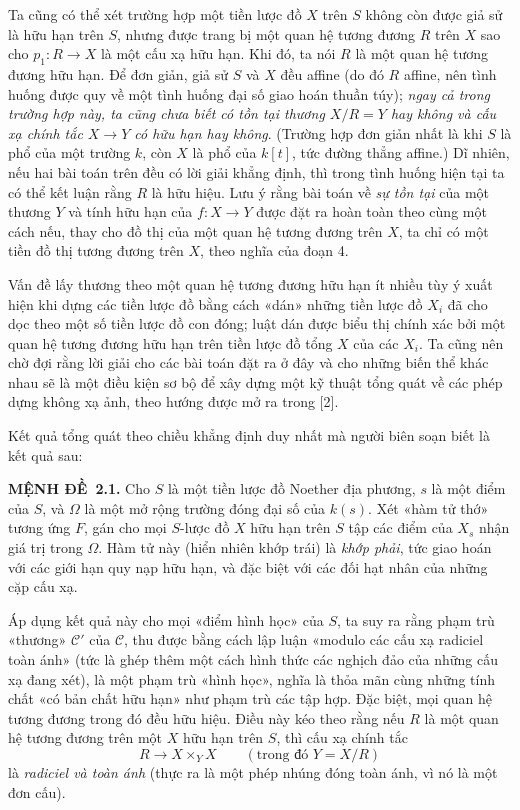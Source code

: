 \documentclass[11pt,twoside,openany]{book}
\numberwithin{equation}{section}
\newcommand{\src}[1]{%
  \phantomsection\hypertarget{src:\fgasourceid:#1}{}%
  \marginpar{\raggedleft\footnotesize\sffamily #1}%
}
\newcommand{\fgasourceid}{unset}
\newcommand{\result}[2]{\par\medskip\noindent\textbf{#1\if\relax\detokenize{#2}\relax\else\ #2\fi.}\quad}
\begin{document}
Ta cũng có thể xét trường hợp một tiền lược đồ $X$ trên $S$ không còn được
giả sử là hữu hạn trên $S$, nhưng được trang bị một quan hệ tương đương $R$
trên $X$ sao cho $p_1:R\longrightarrow X$ là một cấu xạ hữu hạn. Khi đó, ta
nói $R$ là một quan hệ tương đương hữu hạn. Để đơn giản, giả sử $S$ và $X$
đều affine (do đó $R$ affine, nên tình huống được quy về một tình huống đại số
giao hoán thuần túy); \emph{ngay cả trong trường hợp này, ta cũng chưa biết có
tồn tại thương $X/R=Y$ hay không và cấu xạ chính tắc
$X\longrightarrow Y$ có hữu hạn hay không}. (Trường hợp đơn giản nhất là khi
$S$ là phổ của một trường $k$, còn $X$ là phổ của $k[t]$, tức đường thẳng
affine.) Dĩ nhiên, nếu hai bài toán trên đều có lời giải khẳng định, thì trong
tình huống hiện tại ta có thể kết luận rằng $R$ là hữu hiệu. Lưu ý rằng bài
toán về \emph{sự tồn tại} của một thương $Y$ và tính hữu hạn của
$f:X\longrightarrow Y$ được đặt ra hoàn toàn theo cùng một cách nếu, thay cho
đồ thị của một quan hệ tương đương trên $X$, ta chỉ có một tiền đồ thị tương
đương trên $X$, theo nghĩa của đoạn 4.

Vấn đề lấy thương theo một quan hệ tương đương hữu hạn ít nhiều tùy ý xuất
hiện khi dựng các tiền lược đồ bằng cách «dán» những tiền lược đồ $X_i$ đã cho
dọc theo một số tiền lược đồ con đóng; luật dán được biểu thị chính xác bởi
một quan hệ tương đương hữu hạn trên tiền lược đồ tổng $X$ của các $X_i$. Ta
cũng nên chờ đợi rằng lời giải cho các bài toán đặt ra ở đây và cho những biến
thể khác nhau sẽ là một điều kiện sơ bộ để xây dựng một kỹ thuật tổng quát về
các phép dựng không xạ ảnh, theo hướng được mở ra trong [2].

Kết quả tổng quát theo chiều khẳng định duy nhất mà người biên soạn biết là
kết quả sau:

\result{MỆNH ĐỀ}{2.1} Cho $S$ là một tiền lược đồ Noether địa phương, $s$ là
một điểm của $S$, và $\Omega$ là một mở rộng trường đóng đại số của $k(s)$.
Xét
\src{104}«hàm tử thớ» tương ứng $F$, gán cho mọi $S$-lược đồ $X$ hữu hạn
trên $S$ tập các điểm của $X_s$ nhận giá trị trong $\Omega$. Hàm tử này (hiển
nhiên khớp trái) là \emph{khớp phải}, tức giao hoán với các giới hạn quy nạp
hữu hạn, và đặc biệt với các đối hạt nhân của những cặp cấu xạ.

Áp dụng kết quả này cho mọi «điểm hình học» của $S$, ta suy ra rằng phạm trù
«thương» $\mathcal C'$ của $\mathcal C$, thu được bằng cách lập luận «modulo
các cấu xạ radiciel toàn ánh» (tức là ghép thêm một cách hình thức các nghịch
đảo của những cấu xạ đang xét), là một phạm trù «hình học», nghĩa là thỏa mãn
cùng những tính chất «có bản chất hữu hạn» như phạm trù các tập hợp. Đặc biệt,
mọi quan hệ tương đương trong đó đều hữu hiệu. Điều này kéo theo rằng nếu $R$
là một quan hệ tương đương trên một $X$ hữu hạn trên $S$, thì cấu xạ chính tắc
\[
  R\longrightarrow X\times_Y X\qquad (\text{trong đó }Y=X/R)
\]
là \emph{radiciel và toàn ánh} (thực ra là một phép nhúng đóng toàn ánh, vì nó
là một đơn cấu).
\end{document}
